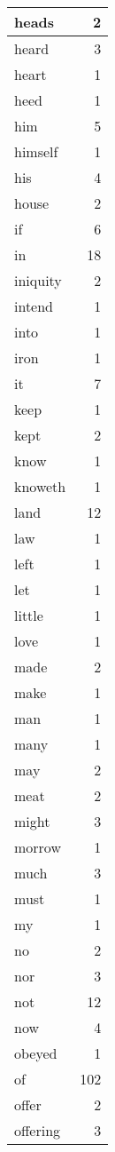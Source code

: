 \begin{center}
\begin{longtable}{l|r}
heads & 2\\ \hline 
heard & 3\\ \hline 
heart & 1\\ \hline 
heed & 1\\ \hline 
him & 5\\ \hline 
himself & 1\\ \hline 
his & 4\\ \hline 
house & 2\\ \hline 
if & 6\\ \hline 
in & 18\\ \hline 
iniquity & 2\\ \hline 
intend & 1\\ \hline 
into & 1\\ \hline 
iron & 1\\ \hline 
it & 7\\ \hline 
keep & 1\\ \hline 
kept & 2\\ \hline 
know & 1\\ \hline 
knoweth & 1\\ \hline 
land & 12\\ \hline 
law & 1\\ \hline 
left & 1\\ \hline 
let & 1\\ \hline 
little & 1\\ \hline 
love & 1\\ \hline 
made & 2\\ \hline 
make & 1\\ \hline 
man & 1\\ \hline 
many & 1\\ \hline 
may & 2\\ \hline 
meat & 2\\ \hline 
might & 3\\ \hline 
morrow & 1\\ \hline 
much & 3\\ \hline 
must & 1\\ \hline 
my & 1\\ \hline 
no & 2\\ \hline 
nor & 3\\ \hline 
not & 12\\ \hline 
now & 4\\ \hline 
obeyed & 1\\ \hline 
of & 102\\ \hline 
offer & 2\\ \hline 
offering & 3\\ \hline 

\end{longtable}
\end{center}
